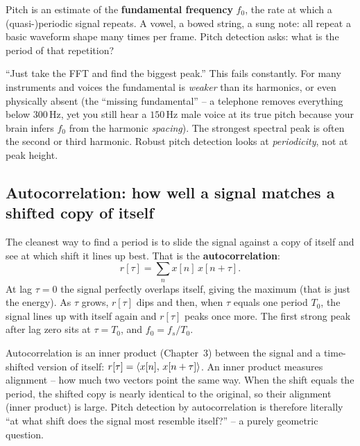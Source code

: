Pitch is an estimate of the
\textbf{fundamental frequency} $f_0$, the rate at which a (quasi-)periodic signal
repeats. A vowel, a bowed string, a sung note: all repeat a basic waveform shape
many times per frame. Pitch detection asks: what is the period of that repetition?

\begin{trapbox}
``Just take the FFT and find the biggest peak.'' This fails constantly. For many
instruments and voices the fundamental is \emph{weaker} than its harmonics, or
even physically absent (the ``missing fundamental'' -- a telephone removes
everything below $300$\,Hz, yet you still hear a $150$\,Hz male voice at its true
pitch because your brain infers $f_0$ from the harmonic \emph{spacing}). The
strongest spectral peak is often the second or third harmonic. Robust pitch
detection looks at \emph{periodicity}, not at peak height.
\end{trapbox}

\subsection*{Autocorrelation: how well a signal matches a shifted copy of itself}

The cleanest way to find a period is to slide the signal against a copy of itself
and see at which shift it lines up best. That is the \textbf{autocorrelation}:
\begin{equation}
\label{ch27:autocorr}
r[\tau] = \sum_{n} x[n]\,x[n+\tau].
\end{equation}
At lag $\tau = 0$ the signal perfectly overlaps itself, giving the maximum (that
is just the energy). As $\tau$ grows, $r[\tau]$ dips and then, when $\tau$ equals
one period $T_0$, the signal lines up with itself again and $r[\tau]$ peaks once
more. The first strong peak after lag zero sits at $\tau = T_0$, and
$f_0 = f_s / T_0$.

\begin{whybox}
Autocorrelation is an inner product (Chapter~3) between the signal and a
time-shifted version of itself: $r[\tau] = \langle x[n],\, x[n+\tau] \rangle$. An inner
product measures alignment -- how much two vectors point the same way. When the
shift equals the period, the shifted copy is nearly identical to the original, so
their alignment (inner product) is large. Pitch detection by autocorrelation is
therefore literally ``at what shift does the signal most resemble itself?'' -- a
purely geometric question.
\end{whybox}


